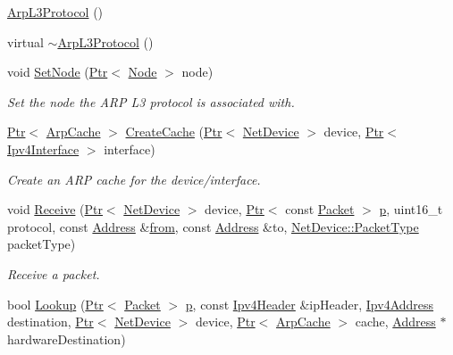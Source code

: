 \begin{DoxyCompactItemize}
\item 
\hyperlink{classns3_1_1ArpL3Protocol_abc71e344dd3155928525b90c61835402}{Arp\+L3\+Protocol} ()
\item 
virtual \hyperlink{classns3_1_1ArpL3Protocol_a62dad25a855cc99875c1f99ad36511b5}{$\sim$\+Arp\+L3\+Protocol} ()
\item 
void \hyperlink{classns3_1_1ArpL3Protocol_a7100d6daf253d51bef7a49d9ea74446f}{Set\+Node} (\hyperlink{classns3_1_1Ptr}{Ptr}$<$ \hyperlink{classns3_1_1Node}{Node} $>$ node)
\begin{DoxyCompactList}\small\item\em Set the node the A\+RP L3 protocol is associated with. \end{DoxyCompactList}\item 
\hyperlink{classns3_1_1Ptr}{Ptr}$<$ \hyperlink{classns3_1_1ArpCache}{Arp\+Cache} $>$ \hyperlink{classns3_1_1ArpL3Protocol_a8edf6394f07185b1637295a79239c2ac}{Create\+Cache} (\hyperlink{classns3_1_1Ptr}{Ptr}$<$ \hyperlink{classns3_1_1NetDevice}{Net\+Device} $>$ device, \hyperlink{classns3_1_1Ptr}{Ptr}$<$ \hyperlink{classns3_1_1Ipv4Interface}{Ipv4\+Interface} $>$ interface)
\begin{DoxyCompactList}\small\item\em Create an A\+RP cache for the device/interface. \end{DoxyCompactList}\item 
void \hyperlink{classns3_1_1ArpL3Protocol_a277509da885e127fb384f296f3858fef}{Receive} (\hyperlink{classns3_1_1Ptr}{Ptr}$<$ \hyperlink{classns3_1_1NetDevice}{Net\+Device} $>$ device, \hyperlink{classns3_1_1Ptr}{Ptr}$<$ const \hyperlink{classns3_1_1Packet}{Packet} $>$ \hyperlink{lte__link__budget__x2__handover__measures_8m_ac9de518908a968428863f829398a4e62}{p}, uint16\+\_\+t protocol, const \hyperlink{classns3_1_1Address}{Address} \&\hyperlink{lte__amc_8m_a1b4c81ff74eb1a626b5ade44c81004b3}{from}, const \hyperlink{classns3_1_1Address}{Address} \&to, \hyperlink{classns3_1_1NetDevice_ace65153f09144f55a0d3e702fc29d6b2}{Net\+Device\+::\+Packet\+Type} packet\+Type)
\begin{DoxyCompactList}\small\item\em Receive a packet. \end{DoxyCompactList}\item 
bool \hyperlink{classns3_1_1ArpL3Protocol_a11df282c1ae9cd812160b309fafc73d1}{Lookup} (\hyperlink{classns3_1_1Ptr}{Ptr}$<$ \hyperlink{classns3_1_1Packet}{Packet} $>$ \hyperlink{lte__link__budget__x2__handover__measures_8m_ac9de518908a968428863f829398a4e62}{p}, const \hyperlink{classns3_1_1Ipv4Header}{Ipv4\+Header} \&ip\+Header, \hyperlink{classns3_1_1Ipv4Address}{Ipv4\+Address} destination, \hyperlink{classns3_1_1Ptr}{Ptr}$<$ \hyperlink{classns3_1_1NetDevice}{Net\+Device} $>$ device, \hyperlink{classns3_1_1Ptr}{Ptr}$<$ \hyperlink{classns3_1_1ArpCache}{Arp\+Cache} $>$ cache, \hyperlink{classns3_1_1Address}{Address} $\ast$hardware\+Destination)

\end{DoxyCompactItemize}
